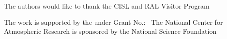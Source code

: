 


%





\begin{acks}
  The authors would like to thank the CISL and RAL Visitor Program

  The work is
  supported by the  under Grant
  No.:~
  The National Center for Atmospheric Research is sponsored by the National Science Foundation

\end{acks}

